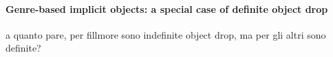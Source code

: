 
\paragraph{Genre-based implicit objects: a special case of definite object drop} 

a quanto pare, per fillmore sono indefinite object drop, ma per gli altri sono definite?



